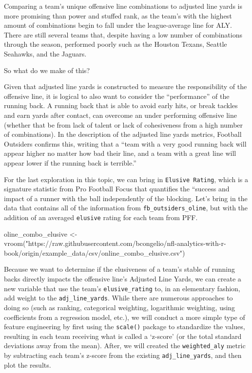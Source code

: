 \documentclass[
  letterpaper,
]{krantz}
\newenvironment{Shaded}{\begin{snugshade}}{\end{snugshade}}
\newcommand{\FunctionTok}[1]{\textcolor[rgb]{0.28,0.35,0.67}{#1}}
\newcommand{\NormalTok}[1]{\textcolor[rgb]{0.00,0.23,0.31}{#1}}
\newcommand{\OtherTok}[1]{\textcolor[rgb]{0.00,0.23,0.31}{#1}}
\newcommand{\StringTok}[1]{\textcolor[rgb]{0.13,0.47,0.30}{#1}}
\begin{document}
Comparing a team's unique offensive line combinations to adjusted line
yards is more promising than power and stuffed rank, as the team's with
the highest amount of combinations begin to fall under the
league-average line for ALY. There are still several teams that, despite
having a low number of combinations through the season, performed poorly
such as the Houston Texans, Seattle Seahawks, and the Jaguars.

So what do we make of this?

Given that adjusted line yards is constructed to measure the
responsibility of the offensive line, it is logical to also want to
consider the ``performance'' of the running back. A running back that is
able to avoid early hits, or break tackles and earn yards after contact,
can overcome an under performing offensive line (whether that be from
lack of talent or lack of cohesiveness from a high number of
combinations). In the description of the adjusted line yards metrics,
Football Outsiders confirms this, writing that a ``team with a very good
running back will appear higher no matter how bad their line, and a team
with a great line will appear lower if the running back is terrible.''

For the last exploration in this topic, we can bring in
\texttt{Elusive\ Rating}, which is a signature statistic from Pro
Football Focus that quantifies the ``success and impact of a runner with
the ball independently of the blocking. Let's bring in the data that
contains all of the information from \texttt{fb\_outsiders\_oline}, but
with the addition of an averaged \texttt{elusive} rating for each team
from PFF.

\begin{Shaded}
\begin{Highlighting}[]
\NormalTok{oline\_combo\_elusive }\OtherTok{\textless{}{-}}
  \FunctionTok{vroom}\NormalTok{(}\StringTok{"https://raw.githubusercontent.com/bcongelio/nfl{-}analytics{-}with{-}r{-}book/origin/example\_data/csv/online\_combo\_elusive.csv"}\NormalTok{)}
\end{Highlighting}
\end{Shaded}

Because we want to determine if the elusiveness of a team's stable of
running backs directly impacts the offensive line's Adjusted Line Yards,
we can create a new variable that use the team's
\texttt{elusive\_rating} to, in an elementary fashion, add weight to the
\texttt{adj\_line\_yards}. While there are numerous approaches to doing
so (such as ranking, categorical weighting, logarithmic weighting, using
coefficients from a regression model, etc.), we will conduct a more
simple type of feature engineering by first using the \texttt{scale()}
package to standardize the values, resulting in each team receiving what
is called a `z-score' (or the total standard deviations away from the
mean). After, we will created the \texttt{weighted\_aly} metric by
subtracting each team's z-score from the existing
\texttt{adj\_line\_yards}, and then plot the results.
\end{document}

